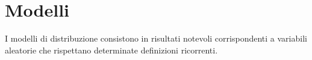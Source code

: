 %
%
%
%


\section{Modelli}
I modelli di distribuzione consistono in risultati notevoli corrispondenti a variabili aleatorie che rispettano determinate definizioni ricorrenti.

